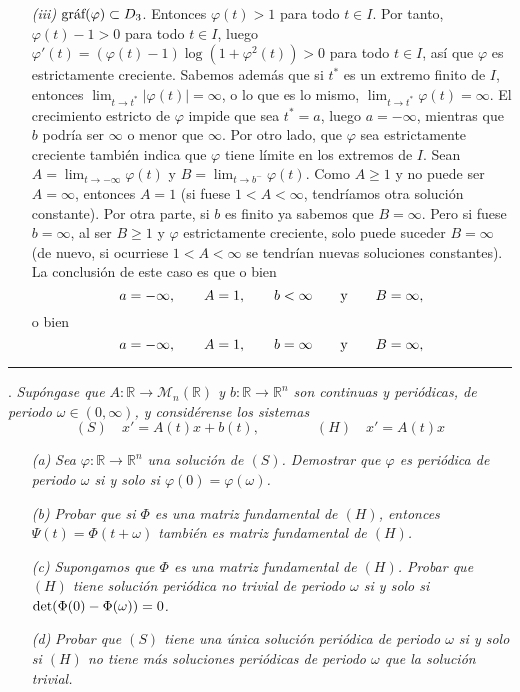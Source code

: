 \documentclass[11pt]{report}
\newcommand{\R}{\mathbb R}
\begin{document}
\begin{itemize}
    \item[\textit{(iii)}] $\textup{gráf}(\varphi) \subset D_3$. Entonces $\varphi(t) >1$ para todo $t \in I$. Por tanto, $\varphi(t)-1 >0$ para todo $t \in I$, luego $\varphi'(t)= (\varphi(t)-1)\log(1+\varphi^2(t)) >0$ para todo $t \in I$, así que $\varphi$ es estrictamente creciente. Sabemos además que si $t^*$ es un extremo finito de $I$, entonces $\lim_{t \to t^*} |\varphi(t)| = \infty$, o lo que es lo mismo, $\lim_{t \to t^*} \varphi(t) = \infty$. El crecimiento estricto de $\varphi$ impide que sea $t^* = a$, luego $a = -\infty$, mientras que $b$ podría ser $\infty$ o menor que $\infty$. Por otro lado, que $\varphi$ sea estrictamente creciente también indica que $\varphi$ tiene límite en los extremos de $I$. Sean $A =\lim_{t \to -\infty} \varphi(t)$ y $B = \lim_{t \to b^-} \varphi(t)$. Como $A \geq 1$ y no puede ser $A=\infty$, entonces $A = 1$ (si fuese $1<A<\infty$, tendríamos otra solución constante). Por otra parte, si $b$ es finito ya sabemos que $B =\infty$. Pero si fuese $b=\infty$, al ser $B \geq 1$ y $\varphi$ estrictamente creciente, solo puede suceder $B = \infty$ (de nuevo, si ocurriese $1<A<\infty$ se tendrían nuevas soluciones constantes). La conclusión de este caso es que o bien
    \[a=-\infty, \qquad A = 1, \qquad b < \infty \qquad \textup{y} \qquad B = \infty,\]
    o bien
    \[a=-\infty, \qquad A = 1, \qquad b = \infty \qquad \textup{y} \qquad B = \infty,\]
\end{itemize}

\vspace{2mm}

\hrule

\vspace{4mm}

. \textit{Supóngase que $A \colon \R \to \mathcal{M}_n(\R)$ y $b \colon \R \to \R^n$ son continuas y periódicas, de periodo $\omega \in (0,\infty)$, y considérense los sistemas}
\[(S) \quad x'=A(t)x+b(t), \qquad \qquad (H) \quad x'=A(t)x\]
\begin{itemize}
    \item[\textit{(a)}] \textit{Sea $\varphi \colon \R \to \R^n$ una solución de $(S)$. Demostrar que $\varphi$ es periódica de periodo $\omega$ si y solo si $\varphi(0) =\varphi(\omega)$.}
    \item[\textit{(b)}] \textit{Probar que si $\Phi$ es una matriz fundamental de $(H)$, entonces $\Psi(t)=\Phi(t+\omega)$ también es matriz fundamental de $(H)$.}
    \item[\textit{(c)}] \textit{Supongamos que $\Phi$ es una matriz fundamental de $(H)$. Probar que $(H)$ tiene solución periódica no trivial de periodo $\omega$ si y solo si $\textup{det}(\Phi(0)-\Phi(\omega))=0$.}
    \item[\textit{(d)}] \textit{Probar que $(S)$ tiene una única solución periódica de periodo $\omega$ si y solo si $(H)$ no tiene más soluciones periódicas de periodo $\omega$ que la solución trivial.}
\end{itemize}
\end{document}
